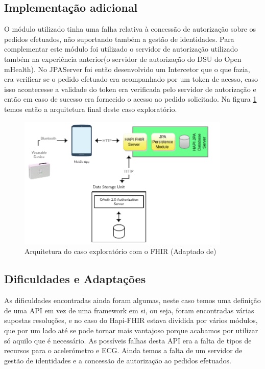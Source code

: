 \subsection{Implementação adicional}
O módulo utilizado tinha uma falha relativa à concessão de autorização sobre os pedidos efetuados, não suportando também a gestão de identidades. Para complementar este módulo foi utilizado o servidor de autorização utilizado também na experiência anterior(o servidor de autorização do \gls{DSU} do Open mHealth).
No JPAServer foi então desenvolvido um Intercetor que o que fazia, era verificar se o pedido efetuado era acompanhado por um token de acesso, caso isso acontecesse a validade do token era verificada pelo servidor de autorização e então em caso de sucesso era fornecido o acesso ao pedido solicitado. Na figura \ref{f:exp-fhir-arch} temos então a arquitetura final deste caso exploratório.
\begin{figure}[H]
  \centering
  \includegraphics[width=0.9\textwidth]{imgs/fhir-arch-exp.png}
  \caption[Arquitetura do caso exploratório com o FHIR]{Arquitetura do caso exploratório com o FHIR (Adaptado de)\cite{hapi-index}}
  
  \label{f:exp-fhir-arch}
\end{figure}

\subsection{Dificuldades e Adaptações}
As dificuldades encontradas ainda foram algumas, neste caso temos uma definição de uma \gls{API} em vez de uma framework em si, ou seja, foram encontradas várias supostas resoluções, e no caso do Hapi-FHIR estava dividida por vários módulos, que por um lado até se pode tornar mais vantajoso porque acabamos por utilizar só aquilo que é necessário. As possíveis falhas desta \gls{API} era a falta de tipos de recursos para o acelerómetro e \gls{ECG}. Ainda temos a falta de um servidor de gestão de identidades e a concessão de autorização ao pedidos efetuados.


